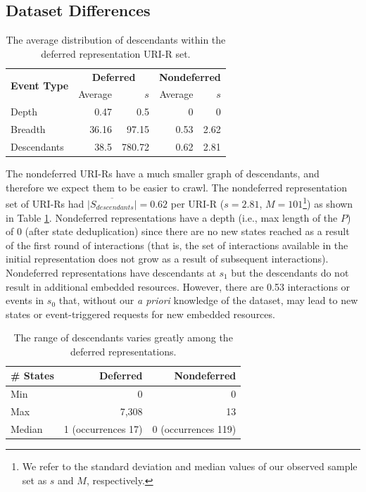 \documentclass{sig-alternate}
\begin{document}
\subsection{Dataset Differences}
\label{diffs}

\begin{table}
\centering
\begin{tabular}{ l | r | r | r | r }
\multirow{2}{*}{\textbf{Event Type}} & \multicolumn{2}{c}{\textbf{Deferred}} & \multicolumn{2}{c}{\textbf{Nondeferred}} \\
                            & Average         & $s$         & Average   &     $s$    \\
\hline
\hline
Depth & 0.47  & 0.5 & 0 & 0 \\
\hline
Breadth & 36.16  & 97.15 & 0.53 & 2.62 \\
\hline
Descendants & 38.5  & 780.72 & 0.62 & 2.81 \\
\hline
\end{tabular}
  \caption{The average distribution of descendants within the deferred representation URI-R set.}
  \label{depthvbreadth}
\end{table}



The nondeferred URI-Rs have a much smaller graph of descendants, and therefore we expect them to be easier to crawl. The nondeferred representation set of URI-Rs had $\overline{|S_{descendants}|}=0.62$ per URI-R ($s=2.81$, $M=101$\footnote{We refer to the standard deviation and median values of our observed sample set as $s$ and $M$, respectively.}) as shown in Table \ref{depthvbreadth}. Nondeferred representations have a depth (i.e., max length of the $P$) of 0 (after state deduplication) since there are no new states reached as a result of the first round of interactions (that is, the set of interactions available in the initial representation does not grow as a result of subsequent interactions). Nondeferred representations have descendants at $s_1$ but the descendants do not result in additional embedded resources. However, there are 0.53 interactions or events in $s_0$ that, without our \emph{a priori} knowledge of the dataset, may lead to new states or event-triggered requests for new embedded resources.

\begin{table}
\centering
\begin{tabular}{ l | r | r }
\textbf{\# States} & \textbf{Deferred} & \textbf{Nondeferred} \\
\hline
\hline
Min & 0 & 0\\
\hline
Max & 7,308 & 13\\
\hline
Median & 1 (occurrences 17) & 0 (occurrences 119)\\
\hline
\end{tabular}
  \caption{The range of descendants varies greatly among the deferred representations.}
  \label{stateminmedmod}
\end{table}
\end{document}
